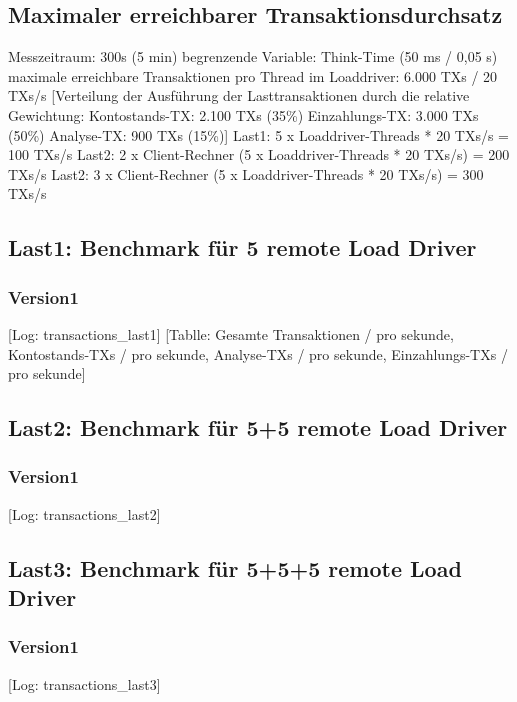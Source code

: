 \subsection{Maximaler erreichbarer Transaktionsdurchsatz}\label{subsec:maximaler-erreichbarer-transaktionsdurchsatz}
Messzeitraum: 300s (5 min)
begrenzende Variable: Think-Time (50 ms / 0,05 s)
maximale erreichbare Transaktionen pro Thread im Loaddriver: 6.000 TXs / 20 TXs/s
[Verteilung der Ausführung der Lasttransaktionen durch die relative Gewichtung:
    Kontostands-TX: 2.100 TXs (35\%)
    Einzahlungs-TX: 3.000 TXs (50\%)
    Analyse-TX:     900 TXs   (15\%)]
Last1: 5 x Loaddriver-Threads * 20 TXs/s = 100 TXs/s
Last2: 2 x Client-Rechner (5 x Loaddriver-Threads * 20 TXs/s) = 200 TXs/s
Last2: 3 x Client-Rechner (5 x Loaddriver-Threads * 20 TXs/s) = 300 TXs/s
\subsection{Last1: Benchmark für 5 remote Load Driver}\label{subsec:benchmark-5-remote-load-driver}
\subsubsection*{Version1}
[Log: transactions\_last1]
[Tablle: Gesamte Transaktionen / pro sekunde, Kontostands-TXs / pro sekunde, Analyse-TXs / pro sekunde, Einzahlungs-TXs / pro sekunde]
\subsection{Last2: Benchmark für 5+5 remote Load Driver}\label{subsec:benchmark-5-5-remote-load-driver}
\subsubsection*{Version1}
[Log: transactions\_last2]
\subsection{Last3: Benchmark für 5+5+5 remote Load Driver}\label{subsec:benchmark-5-5-5-remote-load-driver}
\subsubsection*{Version1}
[Log: transactions\_last3]